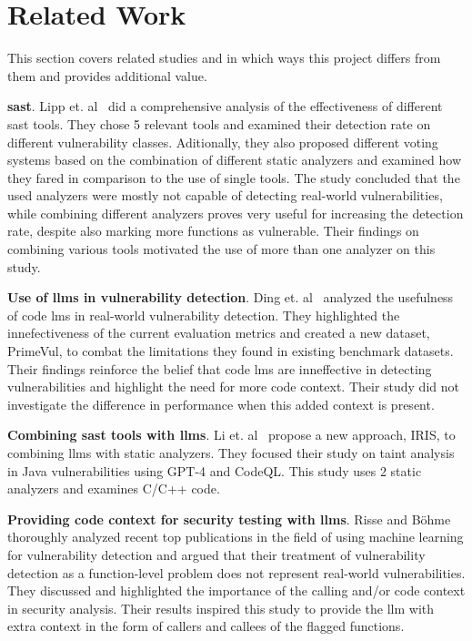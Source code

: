 \section{Related Work}
\label{sec:relwork}
This section covers related studies and in which ways this project differs from them and provides additional value.

\textbf{\Acl{sast}}. 
Lipp et. al~\cite{10.1145/3533767.3534380} did a comprehensive analysis of the effectiveness of different \ac{sast} tools. 
They chose 5 relevant tools and examined their detection rate on different vulnerability classes.
Aditionally, they also proposed different voting systems based on the combination of different static analyzers and examined how they fared in comparison to the use of single tools. 
The study concluded that the used analyzers were mostly not capable of detecting real-world vulnerabilities, while combining different analyzers proves very useful for increasing the detection rate, despite also marking more functions as vulnerable. 
Their findings on combining various tools motivated the use of more than one analyzer on this study.

\textbf{Use of \acp{llm} in vulnerability detection}. 
Ding et. al~\cite{ding2024vulnerabilitydetectioncodelanguage} analyzed the usefulness of code \acp{lm} in real-world vulnerability detection. 
They highlighted the innefectiveness of the current evaluation metrics and created a new dataset, PrimeVul, to combat the limitations they found in existing benchmark datasets. 
Their findings reinforce the belief that code \acp{lm} are inneffective in detecting vulnerabilities and highlight the need for more code context.
Their study did not investigate the difference in performance when this added context is present.

\textbf{Combining \ac{sast} tools with \acp{llm}}.
Li et. al~\cite{li2024llmassistedstaticanalysisdetecting} propose a new approach, IRIS, to combining \acp{llm} with static analyzers. They focused their study on taint analysis in Java vulnerabilities using GPT-4 and CodeQL. This study uses 2 static analyzers and examines C/C++ code.

\textbf{Providing code context for security testing with \acp{llm}}.
Risse and Böhme~\cite{risse2024scorewrongexambenchmarking} thoroughly analyzed recent top publications in the field of using machine learning for vulnerability detection and argued that their treatment of vulnerability detection as a function-level problem does not represent real-world vulnerabilities. They discussed and highlighted the importance of the calling and/or code context in security analysis. Their results inspired this study to provide the \ac{llm} with extra context in the form of callers and callees of the flagged functions.


